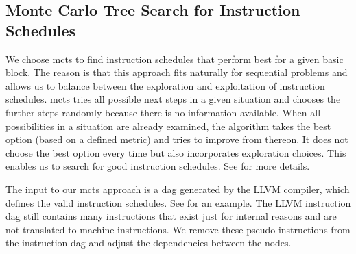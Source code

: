 \subsection{Monte Carlo Tree Search for Instruction Schedules}
\label{subsec:approach:ml:mcts}
We choose \ac{mcts} to find instruction schedules that perform best for a given basic block.
The reason is that this approach fits naturally for sequential problems and allows us to balance between the exploration and exploitation of instruction schedules. 
\ac{mcts} tries all possible next steps in a given situation and chooses the further steps randomly because there is no information available.
When all possibilities in a situation are already examined, the algorithm takes the best option (based on a defined metric) and tries to improve from thereon.
It does not choose the best option every time but also incorporates exploration choices.
This enables us to search for good instruction schedules.
See  for more details.

The input to our \ac{mcts} approach is a \ac{dag} generated by the LLVM compiler, which defines the valid instruction schedules.
See  for an example.
The LLVM instruction \ac{dag} still contains many instructions that exist just for internal reasons and are not translated to machine instructions.
We remove these pseudo-instructions from the instruction \ac{dag} and adjust the dependencies between the nodes.

